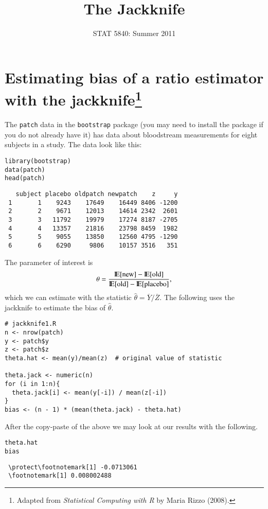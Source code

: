\documentclass[11pt,english]{article}
\title{The Jackknife}
\date{STAT 5840: Summer 2011}
\begin{document}
\maketitle

\thispagestyle{empty}

\section*{Estimating bias of a ratio estimator with the jackknife\footnote{Adapted from \emph{Statistical Computing with R} by Maria Rizzo (2008). }}
\label{sec-1}

The \texttt{patch} data in the \texttt{bootstrap} package (you may need to install the package if you do not already have it) has data about bloodstream measurements for eight subjects in a study.  The data look like this:

\begin{verbatim}
library(bootstrap)
data(patch)
head(patch)
\end{verbatim}




\begin{verbatim}
   subject placebo oldpatch newpatch    z     y
 1       1    9243    17649    16449 8406 -1200
 2       2    9671    12013    14614 2342  2601
 3       3   11792    19979    17274 8187 -2705
 4       4   13357    21816    23798 8459  1982
 5       5    9055    13850    12560 4795 -1290
 6       6    6290     9806    10157 3516   351
\end{verbatim}


The parameter of interest is
\[
\theta = \frac{\mathrm{I\hspace{-1.5pt}E}[\mathrm{new}] - \mathrm{I\hspace{-1.5pt}E}[\mathrm{old}]}{\mathrm{I\hspace{-1.5pt}E}[\mathrm{old}] - \mathrm{I\hspace{-1.5pt}E}[\mathrm{placebo}]},
\]
which we can estimate with the statistic \(\hat{\theta} = \overline{Y}/\overline{Z}\).  The following uses the jackknife to estimate the bias of $\hat{\theta}$.


\begin{verbatim}
# jackknife1.R
n <- nrow(patch)
y <- patch$y
z <- patch$z
theta.hat <- mean(y)/mean(z)  # original value of statistic

theta.jack <- numeric(n)
for (i in 1:n){
  theta.jack[i] <- mean(y[-i]) / mean(z[-i])
}
bias <- (n - 1) * (mean(theta.jack) - theta.hat)
\end{verbatim}




After the copy-paste of the above we may look at our results with the following.

\begin{verbatim}
theta.hat
bias
\end{verbatim}




\begin{verbatim}
 \protect\footnotemark[1] -0.0713061
 \footnotemark[1] 0.008002488
\end{verbatim}
\end{document}

